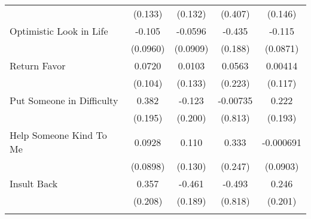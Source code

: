 {\begin{tabular}{l*{4}{c}}
            &     (0.133)         &     (0.132)         &     (0.407)         &     (0.146)         \\
[1em]
Optimistic Look in Life&      -0.105         &     -0.0596         &      -0.435\sym{*}  &      -0.115         \\
            &    (0.0960)         &    (0.0909)         &     (0.188)         &    (0.0871)         \\
[1em]
Return Favor&      0.0720         &      0.0103         &      0.0563         &     0.00414         \\
            &     (0.104)         &     (0.133)         &     (0.223)         &     (0.117)         \\
[1em]
Put Someone in Difficulty&       0.382         &      -0.123         &    -0.00735         &       0.222         \\
            &     (0.195)         &     (0.200)         &     (0.813)         &     (0.193)         \\
[1em]
Help Someone Kind To Me&      0.0928         &       0.110         &       0.333         &   -0.000691         \\
            &    (0.0898)         &     (0.130)         &     (0.247)         &    (0.0903)         \\
[1em]
Insult Back &       0.357         &      -0.461\sym{*}  &      -0.493         &       0.246         \\
            &     (0.208)         &     (0.189)         &     (0.818)         &     (0.201)         \\
\hline\hline
{}\\
\end{tabular}
}
